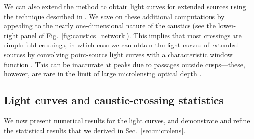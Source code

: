 \documentclass{aastex6}
\newcommand{\reffig}[1]{Fig.~\ref{fig:#1}}
\newcommand{\refsec}[1]{Sec.~\ref{sec:#1}}
\begin{document}
We can also extend the method to obtain light curves for extended sources using the technique described in \cite{1999MNRAS.306..223W}. We save on these additional computations by appealing to the nearly one-dimensional nature of the caustics (see the lower-right panel of \reffig{caustics_network}). This implies that most crossings are simple fold crossings, in which case we can obtain the light curves of extended sources by convolving point-source light curves with a characteristic window function \citep{1987A&A...171...49S, 1991ApJ...379...94M}. This can be inaccurate at peaks due to passages outside cusps---these, however, are rare in the limit of large microlensing optical depth \citep{1992A&A...258..591W}.

\subsection{Light curves and caustic-crossing statistics}
\label{sec:lcresults}

We now present numerical results for the light curves, and demonstrate and refine the statistical results that we derived in \refsec{microlens}.
\end{document}
